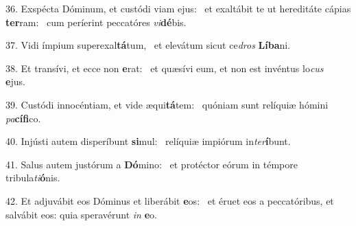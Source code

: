 36. Exspécta Dóminum, et custódi viam ejus: \dag\  et exaltábit te ut hereditáte cápias \textbf{ter}ram: \ast\  cum períerint peccatóres \textit{vi}\textbf{dé}bis.\

37. Vidi ímpium superexal\textbf{tá}tum, \ast\  et elevátum sicut ce\textit{dros} \textbf{Lí}\textbf{ba}ni.\

38. Et transívi, et ecce non \textbf{e}rat: \ast\  et quæsívi eum, et non est invéntus lo\textit{cus} \textbf{e}jus.\

39. Custódi innocéntiam, et vide æqui\textbf{tá}tem: \ast\  quóniam sunt relíquiæ hómini \textit{pa}\textbf{cí}\textbf{fi}co.\

40. Injústi autem disperíbunt \textbf{si}mul: \ast\  relíquiæ impiórum in\textit{ter}\textbf{í}bunt.\

41. Salus autem justórum a \textbf{Dó}mino: \ast\  et protéctor eórum in témpore tribula\textit{ti}\textbf{ó}nis.\

42. Et adjuvábit eos Dóminus et liberábit \textbf{e}os: \ast\  et éruet eos a peccatóribus, et salvábit eos: quia speravérunt \textit{in} \textbf{e}o.\


